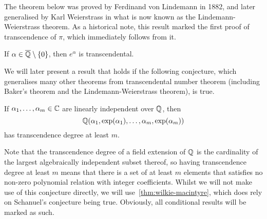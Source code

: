 
The theorem below was proved by Ferdinand von Lindemann in 1882, and later generalised by Karl Weierstrass in what is now known as the Lindemann-Weierstrass theorem. As a historical note, this result marked the first proof of transcendence of $\pi$, which immediately follows from it.

\begin{theorem}[Lindemann]
If $\alpha \in \overline{\mathbb{Q}} \setminus \lbrace 0 \rbrace$, then $e^{\alpha}$ is transcendental.
\end{theorem}

We will later present a result that holds if the following conjecture, which generalises many other theorems from transcendental number theorem (including Baker's theorem and the Lindemann-Weierstrass theorem), is true.

\begin{conjecture}[Schanuel]
    If $\alpha_{1}, \ldots, \alpha_{m} \in \mathbb{C}$ are linearly independent over $\mathbb{Q}$, then \[\mathbb{Q}(\alpha_{1}, \exp(\alpha_{1}), \ldots, \alpha_{m}, \exp(\alpha_{m}))\] has transcendence degree at least $m$.
\end{conjecture}
Note that the transcendence degree of a field extension of $\mathbb{Q}$ is the cardinality of the largest algebraically independent subset thereof, so having transcendence degree at least $m$ means that there is a set of at least $m$ elements that satisfies no non-zero polynomial relation with integer coefficients.
Whilst we will not make use of this conjecture directly, we will use~\cref{thm:wilkie-macintyre}, which does rely on Schanuel's conjecture being true. Obviously, all conditional results will be marked as such.

